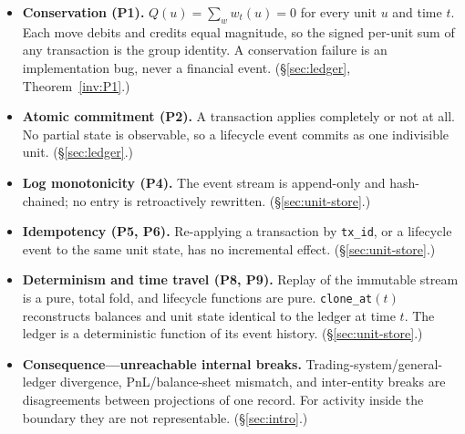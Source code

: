 \begin{itemize}[nosep]
\item \textbf{Conservation (P1).} $Q(u)=\sum_w w_t(u)=0$ for every unit $u$ and time $t$.
Each move debits and credits equal magnitude, so the signed per-unit sum of any
transaction is the group identity. A conservation failure is an implementation bug, never
a financial event. (\S\ref{sec:ledger}, Theorem~\ref{inv:P1}.)
\item \textbf{Atomic commitment (P2).} A transaction applies completely or not at all. No
partial state is observable, so a lifecycle event commits as one indivisible unit.
(\S\ref{sec:ledger}.)
\item \textbf{Log monotonicity (P4).} The event stream is append-only and hash-chained; no
entry is retroactively rewritten. (\S\ref{sec:unit-store}.)
\item \textbf{Idempotency (P5, P6).} Re-applying a transaction by \texttt{tx\_id}, or a
lifecycle event to the same unit state, has no incremental effect.
(\S\ref{sec:unit-store}.)
\item \textbf{Determinism and time travel (P8, P9).} Replay of the immutable stream is a
pure, total fold, and lifecycle functions are pure. \texttt{clone\_at}$(t)$ reconstructs
balances and unit state identical to the ledger at time $t$. The ledger is a deterministic
function of its event history. (\S\ref{sec:unit-store}.)
\item \textbf{Consequence---unreachable internal breaks.} Trading-system/general-ledger
divergence, PnL/balance-sheet mismatch, and inter-entity breaks are disagreements between
projections of one record. For activity inside the boundary they are not representable.
(\S\ref{sec:intro}.)
\end{itemize}


